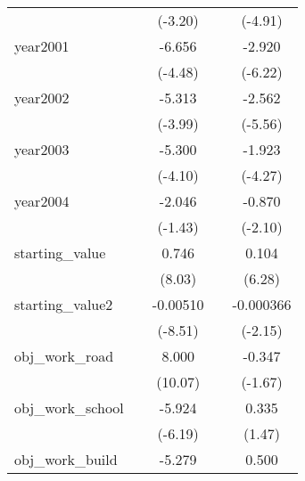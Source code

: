 {\begin{tabular}{l*{4}{c}}
            &                     &     (-3.20)         &                     &     (-4.91)         \\
[1em]
year2001    &                     &      -6.656\sym{***}&                     &      -2.920\sym{***}\\
            &                     &     (-4.48)         &                     &     (-6.22)         \\
[1em]
year2002    &                     &      -5.313\sym{***}&                     &      -2.562\sym{***}\\
            &                     &     (-3.99)         &                     &     (-5.56)         \\
[1em]
year2003    &                     &      -5.300\sym{***}&                     &      -1.923\sym{***}\\
            &                     &     (-4.10)         &                     &     (-4.27)         \\
[1em]
year2004    &                     &      -2.046         &                     &      -0.870\sym{*}  \\
            &                     &     (-1.43)         &                     &     (-2.10)         \\
[1em]
starting\_value&                     &       0.746\sym{***}&                     &       0.104\sym{***}\\
            &                     &      (8.03)         &                     &      (6.28)         \\
[1em]
starting\_value2&                     &    -0.00510\sym{***}&                     &   -0.000366\sym{*}  \\
            &                     &     (-8.51)         &                     &     (-2.15)         \\
[1em]
obj\_work\_road&                     &       8.000\sym{***}&                     &      -0.347         \\
            &                     &     (10.07)         &                     &     (-1.67)         \\
[1em]
obj\_work\_school&                     &      -5.924\sym{***}&                     &       0.335         \\
            &                     &     (-6.19)         &                     &      (1.47)         \\
[1em]
obj\_work\_build&                     &      -5.279\sym{***}&                     &       0.500\sym{*}  \\

\end{tabular}}
